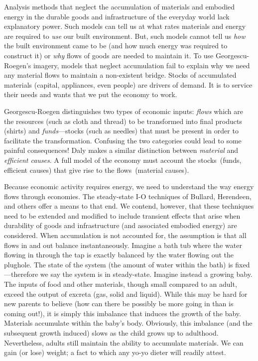 Analysis methods that neglect the accumulation 
of materials and embodied energy 
in the durable goods and infrastructure 
of the everyday world lack explanatory power. 
Such models can tell us at what rates materials 
and energy are required 
to \emph{use} our built environment. 
But, such models cannot tell us \emph{how} 
the built environment came to be 
(and how much energy was required to construct it) 
or \emph{why} flows of goods are needed to maintain it. 
To use Georgescu-Roegen's imagery, 
models that neglect accumulation fail to explain 
why we need any material flows to maintain a non-existent bridge. 
Stocks of accumulated materials 
(capital, appliances, even people) 
are drivers of demand. 
It is to service their needs and wants that we put the economy to work. 

Georgescu-Roegen distinguishes two types of economic
inputs: \emph{flows} which are the resources (such as cloth and thread)
to be transformed into final products (shirts) 
and \emph{funds}---stocks
(such as needles) that must be present in order to facilitate the transformation.
Confusing the two categories could lead to some painful 
consequences!\cite{G-R1970}
Daly makes a similar distinction between \emph{material} 
and \emph{efficient causes}.\cite{Daly2006}
A full model of the economy must account the 
stocks~(funds, efficient causes) that give rise
to the flows~(material causes).

Because economic activity requires energy, 
we need to understand the way energy flows through economies. 
The steady-state I-O techniques of Bullard, Herendeen, 
and others\cite{Bullard1975,Herendeen1978} 
offer a means to that end. 
We contend, however, that these techniques 
need to be extended and modified 
to include transient effects 
that arise when durability of goods and infrastructure 
(and associated embodied energy) are considered. 
When accumulation is not accounted for,
the assumption is that all flows in and out balance
instantaneously.
Imagine a bath tub where the water flowing in
through the tap is exactly balanced by the water
flowing out the plughole.
The state of the system 
(the amount of water within the bath) is 
fixed---therefore we say the system is in
steady-state.
Imagine instead a growing baby.
The inputs of food and other materials,
though small compared to an adult,
exceed the output of excreta
(gas, solid and liquid).
While this may be hard for new parents to believe
(how can there be possibly be more going in than is coming out!),
it is simply this imbalance that induces the growth of the baby.
Materials accumulate within the baby's body.
Obviously, 
this imbalance (and the subsequent growth induced)
slows as the child grows up to adulthood.
Nevertheless,
adults still maintain the ability to accumulate
materials.
We can gain (or lose) weight;
a fact to which any yo-yo dieter will readily attest.


